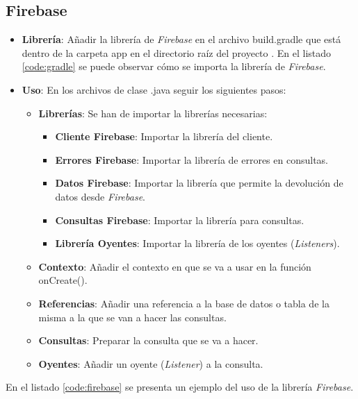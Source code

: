 	\newpage
	\subsection{Firebase}
	\begin{itemize}
		\item {\bf Librería}: Añadir la librería de {\it Firebase} en el archivo {\ttfamily build.gradle} que está dentro de la carpeta {\ttfamily app} en el directorio raíz del proyecto \CollegeApp. En el listado \ref{code:gradle} se puede observar cómo se importa la librería de {\it Firebase}.
		
		
		
		\item {\bf Uso}: En los archivos de clase {\ttfamily .java }\cite{19:java:online} seguir los siguientes pasos:
		\begin{itemize}
			\item {\bf Librerías}: Se han de importar la librerías necesarias:
			\begin{itemize}
				\item {\bf Cliente Firebase}: Importar la librería del cliente.
				\item {\bf Errores Firebase}: Importar la librería de errores en consultas.
				\item {\bf Datos Firebase}: Importar la librería que permite la devolución de datos desde {\it Firebase}.
				\item {\bf Consultas Firebase}: Importar la librería para consultas.
				\item {\bf Librería Oyentes}: Importar la librería de los oyentes ({\it Listeners}).
			\end{itemize}
			\item {\bf Contexto}: Añadir el contexto en que se va a usar en la función {\ttfamily onCreate()}.
			\item {\bf Referencias}: Añadir una referencia a la base de datos o tabla de la misma a la que se van a hacer las consultas.
			\item {\bf Consultas}: Preparar la consulta que se va a hacer.
			\item {\bf Oyentes}: Añadir un oyente ({\it Listener}) a la consulta.
		\end{itemize}
	\end{itemize}

	En el listado \ref{code:firebase} se presenta un ejemplo del uso de la librería {\it Firebase}.
	
